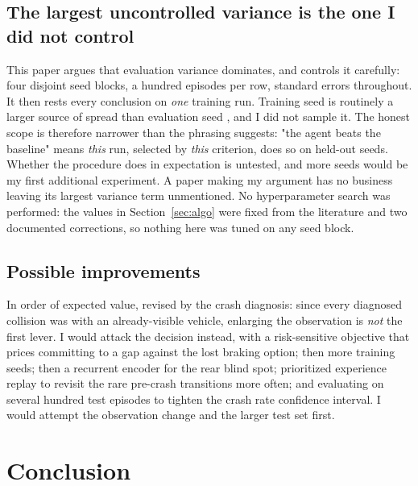 \documentclass{article}
\begin{document}
\subsection{The largest uncontrolled variance is the one I did not control}

This paper argues that evaluation variance dominates, and controls it carefully: four disjoint seed blocks, a hundred episodes per row, standard errors throughout. It then rests every conclusion on \emph{one} training run. Training seed is routinely a larger source of spread than evaluation seed \cite{henderson2018,agarwal2021}, and I did not sample it. The honest scope is therefore narrower than the phrasing suggests: "the agent beats the baseline" means \emph{this} run, selected by \emph{this} criterion, does so on held-out seeds. Whether the procedure does in expectation is untested, and more seeds would be my first additional experiment. A paper making my argument has no business leaving its largest variance term unmentioned. No hyperparameter search was performed: the values in Section~\ref{sec:algo} were fixed from the literature and two documented corrections, so nothing here was tuned on any seed block.

\subsection{Possible improvements}

In order of expected value, revised by the crash diagnosis: since every diagnosed collision was with an already-visible vehicle, enlarging the observation is \emph{not} the first lever. I would attack the decision instead, with a risk-sensitive objective that prices committing to a gap against the lost braking option; then more training seeds; then a recurrent encoder \cite{hausknecht2015} for the rear blind spot; prioritized experience replay \cite{schaul2016} to revisit the rare pre-crash transitions more often; and evaluating on several hundred test episodes to tighten the crash rate confidence interval. I would attempt the observation change and the larger test set first.

\section{Conclusion}
\end{document}
